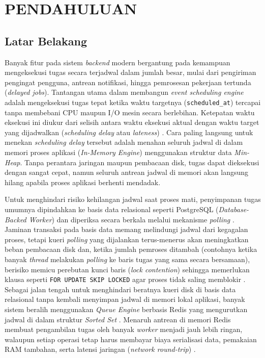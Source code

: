 \newpage
\chapter{PENDAHULUAN} \label{Bab I}

\section{Latar Belakang} \label{I.Latar Belakang}
Banyak fitur pada sistem \textit{backend} modern bergantung pada kemampuan mengeksekusi tugas secara terjadwal dalam jumlah besar, mulai dari pengiriman pengingat pengguna, antrean notifikasi, hingga pemrosesan pekerjaan tertunda (\textit{delayed jobs}). Tantangan utama dalam membangun \textit{event scheduling engine} adalah mengeksekusi tugas tepat ketika waktu targetnya (\texttt{scheduled\_at}) tercapai tanpa membebani CPU maupun I/O mesin secara berlebihan. Ketepatan waktu eksekusi ini diukur dari selisih antara waktu eksekusi aktual dengan waktu target yang dijadwalkan (\textit{scheduling delay} atau \textit{lateness}) \cite{buttazzo2011hard}. Cara paling langsung untuk menekan \textit{scheduling delay} tersebut adalah menahan seluruh jadwal di dalam memori proses aplikasi (\textit{In-Memory Engine}) menggunakan struktur data \textit{Min-Heap}. Tanpa perantara jaringan maupun pembacaan disk, tugas dapat dieksekusi dengan sangat cepat, namun seluruh antrean jadwal di memori akan langsung hilang apabila proses aplikasi berhenti mendadak.\par

Untuk menghindari risiko kehilangan jadwal saat proses mati, penyimpanan tugas umumnya dipindahkan ke basis data relasional seperti PostgreSQL (\textit{Database-Backed Worker}) dan diperiksa secara berkala melalui mekanisme \textit{polling} \cite{skiadopoulos2022dbos}. Jaminan transaksi pada basis data memang melindungi jadwal dari kegagalan proses, tetapi kueri \textit{polling} yang dijalankan terus-menerus akan meningkatkan beban pembacaan disk dan, ketika jumlah pemroses ditambah (contohnya ketika banyak \textit{thread} melakukan \textit{polling} ke baris tugas yang sama secara bersamaan), berisiko memicu perebutan kunci baris (\textit{lock contention}) sehingga memerlukan klausa seperti \texttt{FOR UPDATE SKIP LOCKED} agar proses tidak saling memblokir \cite{postgresql2025doc}. Sebagai jalan tengah untuk menghindari beratnya kueri disk di basis data relasional tanpa kembali menyimpan jadwal di memori lokal aplikasi, banyak sistem beralih menggunakan \textit{Queue Engine} berbasis Redis yang mengurutkan jadwal di dalam struktur \textit{Sorted Set} \cite{carlson2013redis}. Menaruh antrean di memori Redis membuat pengambilan tugas oleh banyak \textit{worker} menjadi jauh lebih ringan, walaupun setiap operasi tetap harus membayar biaya serialisasi data, pemakaian RAM tambahan, serta latensi jaringan (\textit{network round-trip}) \cite{maharjan2023benchmarking, levin2024unleashing}.\par

